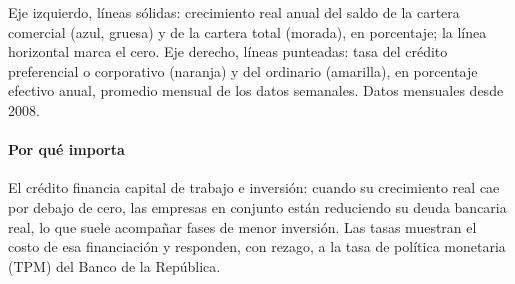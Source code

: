\begin{leer}
Eje izquierdo, líneas sólidas: crecimiento real anual del saldo de la cartera comercial (azul, gruesa) y de la cartera total (morada), en porcentaje; la línea horizontal marca el cero. Eje derecho, líneas punteadas: tasa del crédito preferencial o corporativo (naranja) y del ordinario (amarilla), en porcentaje efectivo anual, promedio mensual de los datos semanales. Datos mensuales desde 2008.
\end{leer}

\paragraph{Por qué importa}
El crédito financia capital de trabajo e inversión: cuando su crecimiento real cae por debajo de cero, las empresas en conjunto están reduciendo su deuda bancaria real, lo que suele acompañar fases de menor inversión. Las tasas muestran el costo de esa financiación y responden, con rezago, a la tasa de política monetaria (TPM) del Banco de la República.

